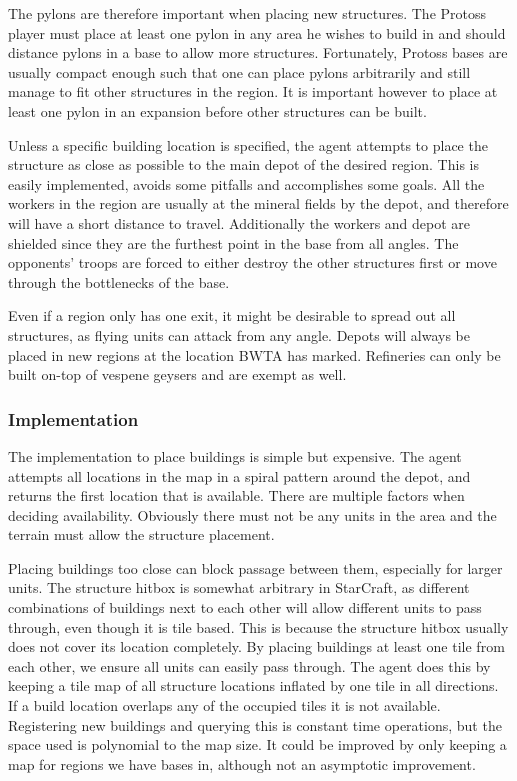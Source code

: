 	The pylons are therefore important when placing new structures. The Protoss player must place at least one pylon in any area he wishes to build in and should distance pylons in a base to allow more structures. Fortunately, Protoss bases are usually compact enough such that one can place pylons arbitrarily and still manage to fit other structures in the region. It is important however to place at least one pylon in an expansion before other structures can be built.
	
	Unless a specific building location is specified, the agent attempts to place the structure as close as possible to the main depot of the desired region. This is easily implemented, avoids some pitfalls and accomplishes some goals. All the workers in the region are usually at the mineral fields by the depot, and therefore will have a short distance to travel. Additionally the workers and depot are shielded since they are the furthest point in the base from all angles. The opponents' troops are forced to either destroy the other structures first or move through the bottlenecks of the base.
	
	Even if a region only has one exit, it might be desirable to spread out all structures, as flying units can attack from any angle. Depots will always be placed in new regions at the location BWTA has marked. Refineries can only be built on-top of vespene geysers and are exempt as well.
	
		\subsubsection*{Implementation}
		The implementation to place buildings is simple but expensive. The agent attempts all locations in the map in a spiral pattern around the depot, and returns the first location that is available. There are multiple factors when deciding availability. Obviously there must not be any units in the area and the terrain must allow the structure placement.
		
		Placing buildings too close can block passage between them, especially for larger units. The structure hitbox is somewhat arbitrary in StarCraft, as different combinations of buildings next to each other will allow different units to pass through, even though it is tile based. This is because the structure hitbox usually does not cover its location completely. By placing buildings at least one tile from each other, we ensure all units can easily pass through. The agent does this by keeping a tile map of all structure locations inflated by one tile in all directions. If a build location overlaps any of the occupied tiles it is not available. Registering new buildings and querying this is constant time operations, but the space used is polynomial to the map size. It could be improved by only keeping a map for regions we have bases in, although not an asymptotic improvement.
		

